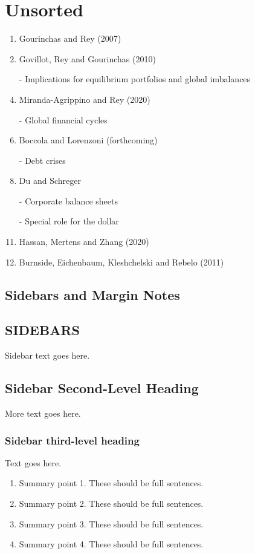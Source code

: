 \documentclass{ar-1col}
\begin{document}
\section{Unsorted}
\begin{enumerate}
\item Gourinchas and Rey (2007)
\item Govillot, Rey and Gourinchas (2010)
\item[-] Implications for equilibrium portfolios and global imbalances
\item Miranda-Agrippino and Rey (2020)
\item[-] Global financial cycles
\item Boccola and Lorenzoni (forthcoming)
\item[-] Debt crises
\item Du and Schreger
\item[-] Corporate balance sheets
\item[-] Special role for the dollar
\item Hassan, Mertens and Zhang (2020)
\item Burnside, Eichenbaum, Kleshchelski and Rebelo (2011)
\end{enumerate}



\subsection{Sidebars and Margin Notes}
\begin{marginnote}[]
    
\end{marginnote}

\begin{textbox}[h]\section{SIDEBARS}
  Sidebar text goes here.
  \subsection{Sidebar Second-Level Heading}
  More text goes here.\subsubsection{Sidebar third-level heading} Text
  goes here.\end{textbox}


\begin{summary}
  \begin{enumerate}
  \item Summary point 1. These should be full sentences.
  \item Summary point 2. These should be full sentences.
  \item Summary point 3. These should be full sentences.
  \item Summary point 4. These should be full sentences.
  \end{enumerate}
\end{summary}
\end{document}
